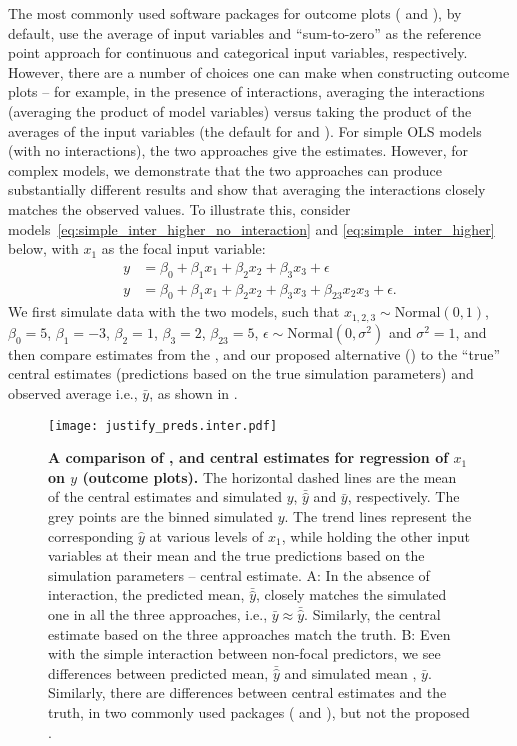 The most commonly used  software packages for outcome plots ( and ), by default, use the average of input variables and ``sum-to-zero'' as the reference point approach for continuous and categorical input variables, respectively. However, there are a number of choices one can make when constructing outcome plots -- for example, in the presence of interactions, averaging the interactions (averaging the product of model variables) versus taking the product of the averages of the input variables (the default for  and ). For simple OLS models (with no interactions), the two approaches give the estimates. However, for complex models, we demonstrate that the two approaches can produce substantially different results and show that averaging the interactions closely matches the observed values. To illustrate this, consider models~\ref{eq:simple_inter_higher_no_interaction} and \ref{eq:simple_inter_higher} below, with $x_1$ as the focal input variable:
%
\begin{align}
y &= \beta_0 + \beta_1x_1 + \beta_2x_2 + \beta_3x_3 + \epsilon \label{eq:simple_inter_higher_no_interaction}\\
y &= \beta_0 + \beta_1x_1 + \beta_2x_2 + \beta_3x_3 + \beta_{23}x_2x_3 + \epsilon \label{eq:simple_inter_higher}.
\end{align}
%
We first simulate data with the two models, such that $x_{1,2,3} \sim \mathrm{Normal}(0, 1)$, $\beta_0 = 5$, $\beta_1 = -3$, $\beta_2 = 1$, $\beta_3 = 2$, $\beta_{23} = 5$, $\epsilon \sim \mathrm{Normal}(0, \sigma^2)$ and $\sigma^2 = 1$, and then compare estimates from the ,  and our proposed alternative () to the ``true'' central estimates (predictions based on the true simulation parameters) and observed average i.e., $\bar{y}$, as shown in .
%
\begin{figure}
\begin{center}
\texttt{[image: justify\_preds.inter.pdf]}
\end{center}
\caption{{\bf A comparison of ,  and  central estimates for regression of $x_1$ on $y$ (outcome plots).} The horizontal dashed lines are the mean of the central estimates and simulated $y$, $\bar{\hat{y}}$ and $\bar{y}$, respectively. The grey points are the binned simulated $y$. The trend lines represent the corresponding $\hat{y}$ at various levels of $x_1$, while holding the other input variables at their mean and the true predictions based on the simulation parameters -- central estimate. A: In the absence of interaction, the predicted mean, $\bar{\hat{y}}$, closely matches the simulated one in all the three approaches, i.e., $\bar{y} \approx \bar{\hat{y}}$. Similarly, the central estimate based on the three approaches match the truth. B: Even with the simple interaction between non-focal predictors, we see differences between predicted mean, $\bar{\hat{y}}$ and simulated mean , $\bar{y}$. Similarly, there are differences between central estimates and the truth, in two commonly used packages ( and ), but not the proposed .}
\label{fig:justify_plots}
\end{figure}
